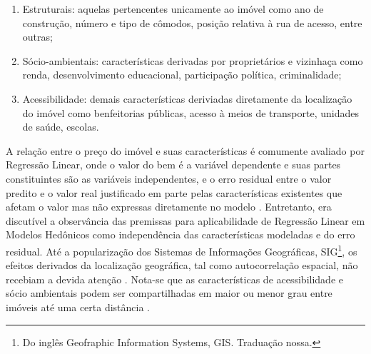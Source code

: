 \begin{enumerate}\label{par:grupo_caracteristicas_imoveis}
\item Estruturais: aquelas pertencentes unicamente ao imóvel como ano de construção, número e tipo de cômodos, posição relativa à rua de acesso, entre outras;

\item Sócio-ambientais: características derivadas por proprietários e vizinhaça como renda, desenvolvimento educacional, participação política, criminalidade;

\item Acessibilidade: demais características deriviadas diretamente da localização do imóvel como benfeitorias públicas, acesso à meios de transporte,  unidades de saúde, escolas.
\end{enumerate}

A relação entre o preço do imóvel e suas características é comumente avaliado por Regressão Linear, onde o valor do bem é a variável dependente e suas partes constituintes são as variáveis independentes, e o erro residual entre o valor predito e o valor real justificado em parte pelas características existentes que afetam o valor mas não expressas diretamente no modelo \cite[p.4]{Long}. Entretanto, era discutível a observância das premissas para aplicabilidade de Regressão Linear em Modelos Hedônicos como independência das características modeladas e do erro residual. Até a popularização dos Sistemas de Informações Geográficas, SIG\footnote{Do inglês Geofraphic Information Systems, GIS. Traduação nossa.}, os efeitos derivados da localização geográfica, tal como autocorrelação espacial, não recebiam a devida atenção \cite[p.1]{Ismail}. Nota-se que as características de acessibilidade e sócio ambientais podem ser compartilhadas em maior ou menor grau entre imóveis até uma certa distância \cite[p.3]{Ismail}. %


